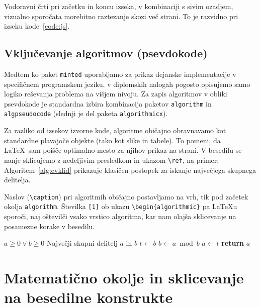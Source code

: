 \documentclass[a4paper,12pt,openright]{book}
\begin{document}
Vodoravni črti pri začetku in koncu izseka, v kombinaciji s sivim ozadjem, vizualno sporočata morebitno raztezanje skozi več strani. To je razvidno pri izseku kode~\ref{code:js}.

\section{Vključevanje algoritmov (psevdokode)}

Medtem ko paket \texttt{minted} uporabljamo za prikaz dejanske implementacije v specifičnem programskem jeziku, v diplomskih nalogah pogosto opisujemo samo logiko reševanja problema na višjem nivoju. Za zapis algoritmov v obliki psevdokode je standardna izbira kombinacija paketov \texttt{algorithm} in \texttt{algpseudocode} (slednji je del paketa \texttt{algorithmicx}).

Za razliko od izsekov izvorne kode, algoritme običajno obravnavamo kot standardne plavajoče objekte (tako kot slike in tabele). To pomeni, da \LaTeX\ sam poišče optimalno mesto za njihov prikaz na strani. V besedilu se nanje sklicujemo z nedeljivim presledkom in ukazom \texttt{\textbackslash ref}, na primer: Algoritem~\ref{alg:evklid} prikazuje klasičen postopek za iskanje največjega skupnega delitelja.

Naslov (\texttt{\textbackslash caption}) pri algoritmih običajno postavljamo na vrh, tik pod začetek okolja \texttt{algorithm}. Številka \texttt{[1]} ob ukazu \texttt{\textbackslash begin\{algorithmic\}} pa \LaTeX u sporoči, naj oštevilči vsako vrstico algoritma, kar nam olajša sklicevanje na posamezne korake v besedilu.

\begin{algorithm}[htbp]
\caption{Evklidov algoritem za iskanje največjega skupnega delitelja}
\label{alg:evklid}
\begin{algorithmic}[1] 
    \Require $a \geq 0 \lor b \geq 0$ %
    \Ensure Največji skupni delitelj $a$ in $b$ %
    \Statex %
            \State $t \gets b$
            \State $b \gets a \bmod b$
            \State $a \gets t$
        \EndWhile
        \State \textbf{return} $a$
    \EndProcedure
\end{algorithmic}
\end{algorithm}

\chapter{Matematično okolje in sklicevanje na besedilne konstrukte}
\label{ch:mat}
\end{document}
